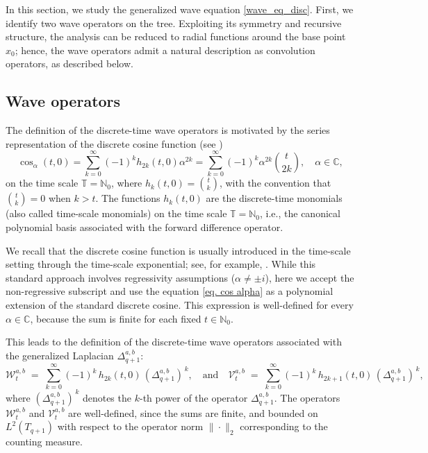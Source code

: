 \documentclass[12pt]{amsart}
\numberwithin{equation}{section}
\theoremstyle{boldremark}
\begin{document}
In this section, we study the generalized wave equation \eqref{wave_eq_disc}. First, we identify two wave operators on the tree. Exploiting its symmetry and recursive structure, the analysis can be reduced to radial functions around the base point $x_0$; hence, the wave operators admit a natural description as convolution operators, as described below.

\subsection{Wave operators}

The definition of the discrete-time wave operators is motivated by the series
representation of the discrete cosine function (see \cite[Theorem~3.5.2]{Cu15})
\begin{equation}\label{eq. cos alpha}
\cos_\alpha(t,0)
=
\sum_{k=0}^\infty (-1)^k h_{2k}(t,0)\alpha^{2k}
=
\sum_{k=0}^\infty (-1)^k \alpha^{2k}\binom{t}{2k},
\quad \alpha\in\mathbb C,
\end{equation}
on the time scale $\mathbb{T}=\mathbb{N}_0$, where $h_{k}(t,0) = \binom{t}{k}$, with the convention that $\binom{t}{k}=0$ when $k>t$. The functions $h_k(t,0)$ are the discrete-time monomials (also called time-scale monomials) on the time scale $\mathbb{T}=\mathbb{N}_0$, i.e., the canonical polynomial basis associated with the forward difference operator.

We recall that the discrete cosine function is usually introduced in the time-scale setting through the time-scale exponential; see, for example, \cite[Definition~3.25]{BP1}. While this standard approach involves regressivity assumptions ($\alpha\neq \pm i$), here we accept the non-regressive subscript and use the equation \eqref{eq. cos alpha} as a polynomial extension of the standard discrete cosine. This expression is well-defined for every $\alpha\in\mathbb C$, because the sum is finite for each fixed $t\in\mathbb N_0$.

This leads to the definition of the discrete-time wave operators associated with the generalized Laplacian $\Delta_{q+1}^{a,b}$:
\begin{equation*}
\mathcal{W}_t^{a,b} \;=\; \sum_{k=0}^{\infty} (-1)^k\, h_{2k}(t,0)\, (\Delta_{q+1}^{a,b})^{\,k}, \quad \text{and} \quad \mathcal{V}_t^{a,b} \;=\; \sum_{k=0}^{\infty} (-1)^k\, h_{2k+1}(t,0)\, (\Delta_{q+1}^{a,b})^{\,k},
\end{equation*}
where $(\Delta_{q+1}^{a,b})^{\,k}$ denotes the $k$-th power of the operator $\Delta_{q+1}^{a,b}$. The operators $\mathcal{W}_t^{a,b}$  and $\mathcal{V}_t^{a,b}$ are well-defined, since the sums are finite, and bounded on $L^2(T_{q+1})$ with respect to the operator norm
$\|\cdot\|_{2}$ corresponding to the counting measure.
\end{document}
